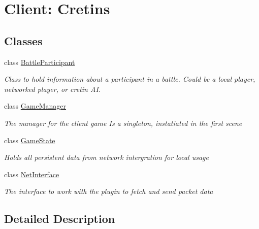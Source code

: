 \hypertarget{group__client}{\section{Client\-: Cretins}
\label{group__client}
}
\subsection*{Classes}
\begin{DoxyCompactItemize}
\item 
class \hyperlink{class_battle_participant}{Battle\-Participant}
\begin{DoxyCompactList}\small\item\em Class to hold information about a participant in a battle. Could be a local player, networked player, or cretin A\-I. \end{DoxyCompactList}\item 
class \hyperlink{class_game_manager}{Game\-Manager}
\begin{DoxyCompactList}\small\item\em The manager for the client game Is a singleton, instatiated in the first scene \end{DoxyCompactList}\item 
class \hyperlink{class_game_state}{Game\-State}
\begin{DoxyCompactList}\small\item\em Holds all persistent data from network intergration for local usage \end{DoxyCompactList}\item 
class \hyperlink{class_net_interface}{Net\-Interface}
\begin{DoxyCompactList}\small\item\em The interface to work with the plugin to fetch and send packet data \end{DoxyCompactList}\end{DoxyCompactItemize}


\subsection{Detailed Description}
